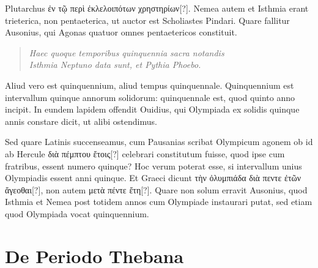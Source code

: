 Plutarchus \textgreek{ἐν τῷ περὶ ἐκλελοιπότων χρηστηρίων[?]}.
Nemea autem et
Isthmia erant trieterica, non pentaeterica, ut auctor est Scholiastes
Pindari.
Quare fallitur Ausonius, qui Agonas quatuor omnes pentaetericos
constituit.
\begin{verse}
\emph{Haec quoque temporibus quinquennia sacra notandis}\\
\emph{Isthmia Neptuno data sunt, et Pythia Phoebo.}
\end{verse}
Aliud vero est quinquennium, aliud tempus quinquennale.
Quinquennium est intervallum quinque annorum solidorum: quinquennale
est, quod quinto anno incipit.
In eundem lapidem offendit
Ouidius, qui Olympiada ex solidis quinque annis constare dicit, ut
alibi ostendimus.

Sed quare Latinis succenseamus, cum Pausanias scribat
Olympicum agonem ob id ab Hercule \textgreek{διὰ πέμπτου ἔτοις[?]} celebrari
constitutum fuisse, quod ipse cum fratribus, essent numero quinque?
Hoc verum poterat esse, si intervallum unius Olympiadis essent anni
quinque.
Et Graeci dicunt \textgreek{τὴν ὀλυμπιάδα διὰ πεντε ἐτῶν ἄγεοθαι[?]}, non
autem \textgreek{μετὰ πέντε ἔτη[?]}.
Quare non solum erravit Ausonius, quod Isthmia
et Nemea post totidem annos cum Olympiade instaurari putat, sed
etiam quod Olympiada vocat quinquennium.

\section{De Periodo Thebana}

